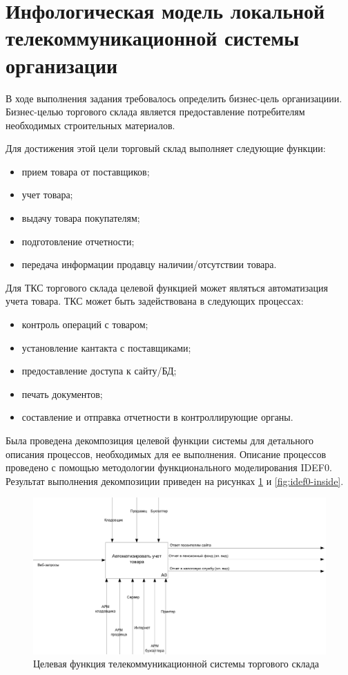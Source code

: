 \section{Инфологическая модель локальной телекоммуникационной системы организации}
\label{sec:inf_model}
В ходе выполнения задания требовалось определить бизнес-цель организациии. Бизнес-целью торгового склада является предоставление потребителям необходимых строительных материалов.

Для достижения этой цели торговый склад выполняет следующие функции:
\begin{itemize}
\item прием товара от поставщиков;
\item учет товара;
\item выдачу товара покупателям;
\item подготовление отчетности;
\item передача информации продавцу наличии/отсутствии товара.
\end{itemize}


Для ТКС торгового склада целевой функцией может являться автоматизация учета товара. ТКС может быть задействована в следующих процессах:
\begin{itemize}
\item контроль операций с товаром;
\item установление кантакта с поставщиками;
\item предоставление доступа к сайту/БД;
\item печать документов;
\item составление и отправка отчетности в контроллирующие органы.
\end{itemize}


Была проведена декомпозиция целевой функции системы для детального описания процессов, необходимых для ее выполнения. Описание процессов проведено с помощью методологии функционального моделирования IDEF0. Результат выполнения декомпозиции приведен на рисунках \ref{fig:idef0-common} и \ref{fig:idef0-inside}.

\begin{figure}
  \includegraphics[width=\linewidth]{appendix/a0.png}
  \caption{Целевая функция телекоммуникационной системы торгового склада}
  \label{fig:idef0-common}
\end{figure}
\clearpage

